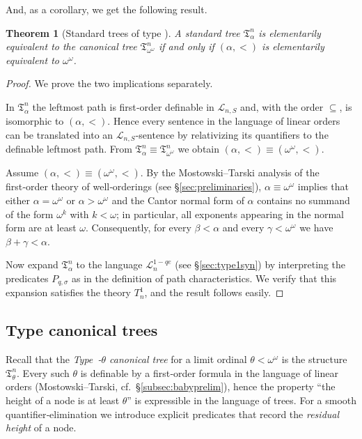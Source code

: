 \documentclass{amsart}
\newtheorem{theorem}{Theorem}
\theoremstyle{definition}
\begin{document}
And, as a corollary, we get the following result.
\begin{theorem}[Standard trees of type \MakeUppercase{}]\label{thm:1-classify}
    A standard tree $\mathfrak{T}_\alpha^n$ is elementarily equivalent to the canonical tree $\mathfrak{T}_{\omega^\omega}^n$ if and only if $(\alpha,<)$ is elementarily equivalent to $\omega^\omega$.
\end{theorem}
\begin{proof}
    We prove the two implications separately.

    In $\mathfrak{T}_\alpha^n$ the leftmost path is first‑order definable in $\mathcal L_{n,S}$ and, with the order $\subseteq$, is isomorphic to $(\alpha,<)$. Hence every sentence in the language of linear orders can be translated into an $\mathcal L_{n,S}$-sentence by relativizing its quantifiers to the definable leftmost path. From $\mathfrak{T}_\alpha^n\equiv\mathfrak{T}_{\omega^\omega}^n$ we obtain $(\alpha,<)\equiv(\omega^\omega,<)$.

    Assume $(\alpha,<)\equiv(\omega^\omega,<)$. By the Mostowski–Tarski analysis of the first‑order theory of well‑orderings (see \S\ref{sec:preliminaries}), $\alpha\equiv\omega^\omega$ implies that either $\alpha=\omega^\omega$ or $\alpha>\omega^\omega$ and the Cantor normal form of $\alpha$ contains no summand of the form $\omega^k$ with $k<\omega$; in particular, all exponents appearing in the normal form are at least $\omega$. Consequently, for every $\beta<\alpha$ and every $\gamma<\omega^\omega$ we have $\beta+\gamma<\alpha$.

    Now expand $\mathfrak{T}_\alpha^n$ to the language $\mathcal L_n^{1-qe}$ (see \S\ref{sec:type1syn}) by interpreting the predicates $P_{q,\sigma}$ as in the definition of path characteristics. We verify that this expansion satisfies the theory $T_n^1$, and the result follows easily.
\end{proof}

\subsection{Type \MakeUppercase{} canonical trees}
\label{sec:type2syn}

Recall that the \emph{Type~{\MakeUppercase{}}-$\theta$ canonical tree} for a limit ordinal $\theta<\omega^\omega$ is the structure $\mathfrak{T}_{\theta}^n$.   Every such $\theta$ is definable by a first‑order formula in the language of linear orders (Mostowski–Tarski, cf.\ \S\ref{subsec:babyprelim}), hence the property ``the height of a node is at least $\theta$'' is expressible in the language of trees. For a smooth quantifier‑elimination we introduce explicit predicates that record the \emph{residual height} of a node.
\end{document}

